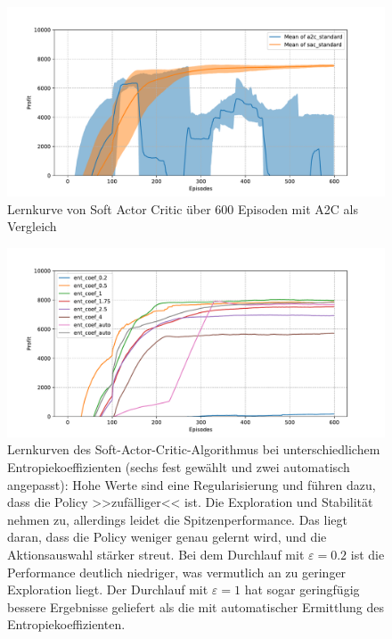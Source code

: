 \begin{figure}[htbp]
	\centering
	\includegraphics[width=\textwidth]{appendix/a2c_vs_sac.pdf}
	\caption{Lernkurve von Soft Actor Critic über 600 Episoden mit A2C als Vergleich}
	\label{graphic:SACvsA2CLearningCurve}
\end{figure}
\begin{figure}[htbp]
	\centering
	\includegraphics[width=\textwidth]{appendix/sac_temperature.pdf}
	\caption{
		Lernkurven des Soft-Actor-Critic-Algorithmus bei unterschiedlichem Entropiekoeffizienten (sechs fest gewählt und zwei automatisch angepasst):
        Hohe Werte sind eine Regularisierung und führen dazu, dass die Policy >>zufälliger<< ist.
        Die Exploration und Stabilität nehmen zu, allerdings leidet die Spitzenperformance.
        Das liegt daran, dass die Policy weniger genau gelernt wird, und die Aktionsauswahl stärker streut.
        Bei dem Durchlauf mit $\varepsilon=0.2$ ist die Performance deutlich niedriger, was vermutlich an zu geringer Exploration liegt.
        Der Durchlauf mit $\varepsilon=1$ hat sogar geringfügig bessere Ergebnisse geliefert als die mit automatischer Ermittlung des Entropiekoeffizienten.
	}
	\label{graphic:SACTemperature}
\end{figure}
